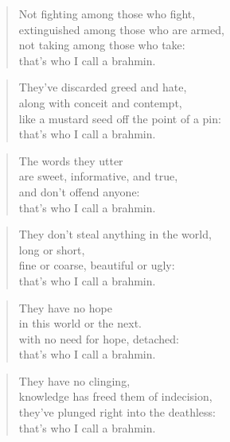 \documentclass[12pt,openany]{book}%
\begin{document}
\begin{verse}%
Not fighting among those who fight, \\
extinguished among those who are armed, \\
not taking among those who take: \\
that’s who I call a brahmin. 

%
\end{verse}

\begin{verse}%
They’ve discarded greed and hate, \\
along with conceit and contempt, \\
like a mustard seed off the point of a pin: \\
that’s who I call a brahmin. 

%
\end{verse}

\begin{verse}%
The words they utter \\
are sweet, informative, and true, \\
and don’t offend anyone: \\
that’s who I call a brahmin. 

%
\end{verse}

\begin{verse}%
They don’t steal anything in the world, \\
long or short, \\
fine or coarse, beautiful or ugly: \\
that’s who I call a brahmin. 

%
\end{verse}

\begin{verse}%
They have no hope \\
in this world or the next. \\
with no need for hope, detached: \\
that’s who I call a brahmin. 

%
\end{verse}

\begin{verse}%
They have no clinging, \\
knowledge has freed them of indecision, \\
they’ve plunged right into the deathless: \\
that’s who I call a brahmin. 

%
\end{verse}
\end{document}
